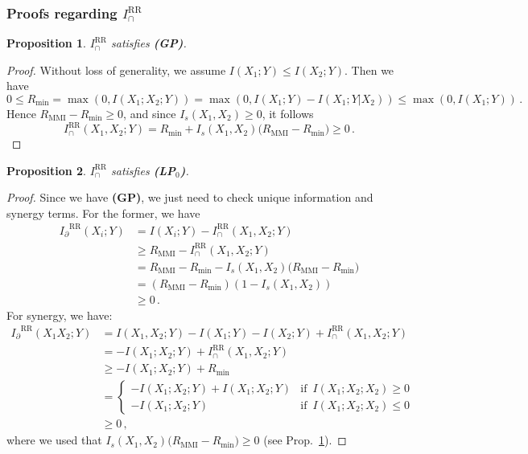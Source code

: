 \documentclass{article}
\newcommand{\ts}[1]{\ensuremath{_{\text{#1}}}}
\newcommand{\Ip}{\ensuremath{I_\partial}\xspace}
\newcommand{\GP}{\textbf{(GP)}\xspace} %
\newcommand{\LPz}{\textbf{(LP\ts{0})}\xspace} %
\newcommand{\IRR}{\ensuremath{I_\cap^{\text{RR}}}\xspace}
\newcommand{\IRRs}{\ensuremath{I_\cap^{\text{RR}}(X_1,X_2;Y)}\xspace}
\newtheorem{proposition}{Proposition}
\begin{document}
\subsubsection{Proofs regarding \IRR}

\begin{proposition} \label{prop:RR-GP}
    $\IRR$ satisfies \GP.
\end{proposition}
\begin{proof}
    Without loss of generality, we assume $I(X_1;Y)\leq I(X_2;Y)$. Then we have
    \begin{equation}
        0\leq R_{\min} = \max (0, I(X_1;X_2;Y)) = \max (0, I(X_1;Y)-I(X_1;Y|X_2))\leq\max (0, I(X_1;Y)) \,.
    \end{equation}
    Hence $R_{\text{MMI}}-R_{\min}\ge0$, and since $I_s(X_1,X_2)\ge0$, it follows
    \begin{equation}
        \IRRs = R_{\min} + I_s(X_1,X_2)\bigl(R_\text{MMI}-R_{\min}\bigr)\ge 0 \,.
    \end{equation}
\end{proof}

\begin{proposition} \label{prop:RR-LPz}
    $\IRR$ satisfies \LPz.
\end{proposition}
\begin{proof}
    Since we have \GP, we just need to check unique information and synergy terms. For the former, we have
    \begin{equation}
    \begin{aligned}
        \Ip^\text{RR}(X_i;Y)& = I(X_i;Y)-\IRRs \\
        & \ge R_\text{MMI} - \IRRs \\
        & = R_\text{MMI} - R_{\min} - I_s(X_1,X_2)\bigl(R_\text{MMI}-R_{\min}\bigr) \\
        & = (R_\text{MMI} - R_{\min})(1-I_s(X_1,X_2)) \\
        & \ge 0 \,.
    \end{aligned}
    \end{equation}
    For synergy, we have:
    \begin{equation}
        \begin{aligned}
            \Ip^\text{RR}(X_1X_2;Y) &= I(X_1,X_2;Y)-I(X_1;Y)-I(X_2;Y) + \IRRs \\
            & = -I(X_1;X_2;Y)+\IRRs \\
            & \ge -I(X_1;X_2;Y)+R_{\min} \\
            & = \begin{cases}
                -I(X_1;X_2;Y) + I(X_1;X_2;Y)  &\text{if }\, I(X_1;X_2;X_2)\ge0 \\
                -I(X_1;X_2;Y) & \text{if }\, I(X_1;X_2;X_2)\le0
            \end{cases} \\
            & \ge 0 \,,
        \end{aligned}
    \end{equation}
    where we used that $ I_s(X_1,X_2)\bigl(R_\text{MMI}-R_{\min}\bigr)\ge 0$ (see Prop.~\ref{prop:RR-GP}).
\end{proof}
\end{document}
